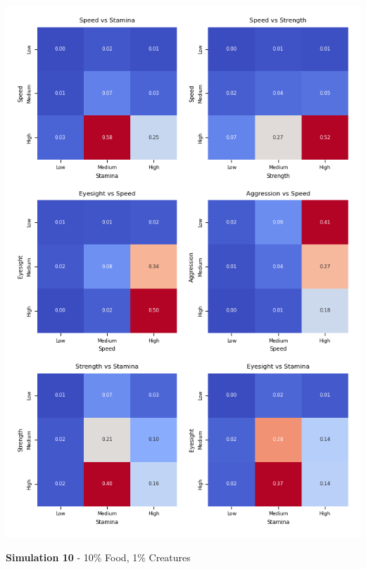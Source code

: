 \documentclass{article}
\begin{document}
\begin{center}
    \includegraphics[scale=0.9]{tests/2.9_confusion_matrices.png}
\end{center}
\textbf{Simulation 10} - 10\% Food, 1\% Creatures
\end{document}
